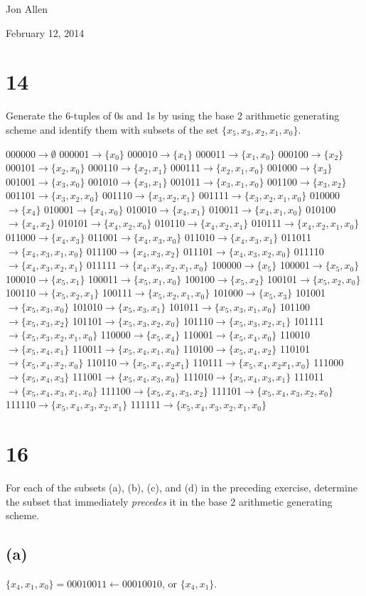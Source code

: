 \documentclass{article}
\begin{document}
Jon Allen

February 12, 2014

\section*{14}
Generate the 6-tuples of 0s and 1s by using the base 2 arithmetic generating scheme and identify them with subsets of the set $\{x_5,x_3,x_2,x_1,x_0\}$.

000000$\to\emptyset$ 000001$\to\{x_0\}$
000010$\to\{x_1\}$ 000011$\to\{x_1,x_0\}$
000100$\to\{x_2\}$ 000101$\to\{x_2,x_0\}$
000110$\to\{x_2,x_1\}$ 000111$\to\{x_2,x_1,x_0\}$
001000$\to\{x_3\}$ 001001$\to\{x_3,x_0\}$
001010$\to\{x_3,x_1\}$ 001011$\to\{x_3,x_1,x_0\}$
001100$\to\{x_3,x_2\}$ 001101$\to\{x_3,x_2,x_0\}$
001110$\to\{x_3,x_2,x_1\}$ 001111$\to\{x_3,x_2,x_1,x_0\}$
010000$\to\{x_4\}$ 010001$\to\{x_4,x_0\}$
010010$\to\{x_4,x_1\}$ 010011$\to\{x_4,x_1,x_0\}$
010100$\to\{x_4,x_2\}$ 010101$\to\{x_4,x_2,x_0\}$
010110$\to\{x_4,x_2,x_1\}$ 010111$\to\{x_4,x_2,x_1,x_0\}$
011000$\to\{x_4,x_3\}$ 011001$\to\{x_4,x_3,x_0\}$
011010$\to\{x_4,x_3,x_1\}$ 011011$\to\{x_4,x_3,x_1,x_0\}$
011100$\to\{x_4,x_3,x_2\}$ 011101$\to\{x_4,x_3,x_2,x_0\}$
011110$\to\{x_4,x_3,x_2,x_1\}$ 011111$\to\{x_4,x_3,x_2,x_1,x_0\}$
100000$\to\{x_5\}$ 100001$\to\{x_5,x_0\}$
100010$\to\{x_5,x_1\}$ 100011$\to\{x_5,x_1,x_0\}$
100100$\to\{x_5,x_2\}$ 100101$\to\{x_5,x_2,x_0\}$
100110$\to\{x_5,x_2,x_1\}$ 100111$\to\{x_5,x_2,x_1,x_0\}$
101000$\to\{x_5,x_3\}$ 101001$\to\{x_5,x_3,x_0\}$
101010$\to\{x_5,x_3,x_1\}$ 101011$\to\{x_5,x_3,x_1,x_0\}$
101100$\to\{x_5,x_3,x_2\}$ 101101$\to\{x_5,x_3,x_2,x_0\}$
101110$\to\{x_5,x_3,x_2,x_1\}$ 101111$\to\{x_5,x_3,x_2,x_1,x_0\}$
110000$\to\{x_5,x_4\}$ 110001$\to\{x_5,x_4,x_0\}$
110010$\to\{x_5,x_4,x_1\}$ 110011$\to\{x_5,x_4,x_1,x_0\}$
110100$\to\{x_5,x_4,x_2\}$ 110101$\to\{x_5,x_4,x_2,x_0\}$
110110$\to\{x_5,x_4,x_2x_1\}$ 110111$\to\{x_5,x_4,x_2x_1,x_0\}$
111000$\to\{x_5,x_4,x_3\}$ 111001$\to\{x_5,x_4,x_3,x_0\}$
111010$\to\{x_5,x_4,x_3,x_1\}$ 111011$\to\{x_5,x_4,x_3,x_1,x_0\}$
111100$\to\{x_5,x_4,x_3,x_2\}$ 111101$\to\{x_5,x_4,x_3,x_2,x_0\}$
111110$\to\{x_5,x_4,x_3,x_2,x_1\}$ 111111$\to\{x_5,x_4,x_3,x_2,x_1,x_0\}$
\section*{16}
For each of the subsets (a), (b), (c), and (d) in the preceding exercise, determine the subset that immediately \emph{precedes} it in the base 2 arithmetic generating scheme.
\subsection*{(a)}
$\{x_4,x_1,x_0\}=00010011\gets00010010$, or $\{x_4,x_1\}$.
\end{document}

